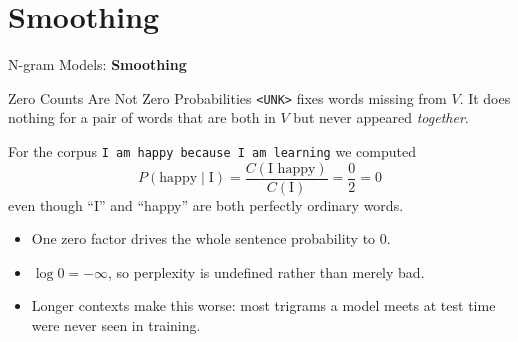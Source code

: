 \section{Smoothing}
\begin{frame}{}
    \LARGE N-gram Models: \textbf{Smoothing}
\end{frame}

\begin{frame}{Zero Counts Are Not Zero Probabilities}
    \texttt{<UNK>} fixes words missing from $V$. It does nothing for a pair of words
    that are both in $V$ but never appeared \emph{together}.

    \vspace{1em}
    For the corpus \texttt{I am happy because I am learning} we computed
    \[
        P(\text{happy} \mid \text{I}) = \frac{C(\text{I happy})}{C(\text{I})}
        = \frac{0}{2} = 0
    \]
    even though ``I'' and ``happy'' are both perfectly ordinary words.

    \vspace{1em}
    \begin{itemize}
        \item One zero factor drives the whole sentence probability to $0$.
        \item $\log 0 = -\infty$, so perplexity is undefined rather than merely bad.
        \item Longer contexts make this worse: most trigrams a model meets at test
        time were never seen in training.
    \end{itemize}
\end{frame}

